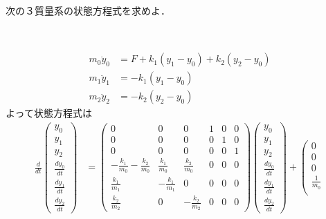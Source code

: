 \documentclass[a4paper,11pt,fleqn]{jreport}
\begin{document}
次の３質量系の状態方程式を求めよ．
\begin{figure}[htbp]
 \begin{center}
 \end{center}
\end{figure}
\begin{align}
	m_0 \ddot{y}_0 & = F + k_1 (y_1 - y_0) + k_2 (y_2-y_0)
\nonumber \\
	m_1 \ddot{y}_1 & = - k_1 (y_1 - y_0)
\nonumber \\
	m_2 \ddot{y}_2 & = - k_2 (y_2 - y_0)
\nonumber
\end{align}
よって状態方程式は
\begin{align}
 \frac{d}{dt} \left(\begin{array}{c}
	         y_0 \\
		     y_1 \\
		     y_2 \\
		     \frac{dy_0}{dt} \\
		     \frac{dy_1}{dt} \\
		     \frac{dy_2}{dt}
		    \end{array}\right)
 &=
 \left(\begin{array}{cccccc}
        0 & 0 & 0 & 1 & 0 & 0      \\
        0 & 0 & 0 & 0 & 1 & 0      \\
        0 & 0 & 0 & 0 & 0 & 1      \\
	-\frac{k_1}{m_0} -\frac{k_2}{m_0}&  \frac{k_1}{m_0} &  \frac{k_2}{m_0} & 0 & 0 & 0 \\
	 \frac{k_1}{m_1}                & -\frac{k_1}{m_1} &  0               & 0 & 0 & 0 \\
	 \frac{k_2}{m_2}                &  0               & -\frac{k_2}{m_2} & 0 & 0 & 0 
       \end{array}\right)
 \left(\begin{array}{c}
	         y_0 \\
		     y_1 \\
		     y_2 \\
		     \frac{dy_0}{dt} \\
		     \frac{dy_1}{dt} \\
		     \frac{dy_2}{dt}
       \end{array}\right)
 +
 \left(\begin{array}{c}
        0 \\
        0 \\
        0 \\
	    \frac{1}{m_0} \\

\end{array}
\end{align}
\end{document}
